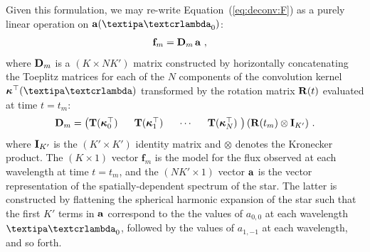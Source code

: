 \documentclass[modern]{aastex631}
\begin{document}
Given this formulation, we may re-write Equation~(\ref{eq:deconv:F}) as a purely linear operation on $\alm(\lnlam_0)$:
%
\begin{align}
    \label{eq:linear:ft}
    {\ensuremath{\mathbf{f}}}_m
     & =
    {\mathbf{D}}_m
    \,
    {\mathbf{a}}
    \hskip 0.33em,
\end{align}
%
where ${\mathbf{D}}_m$ is a $(K \times N K')$ matrix constructed by horizontally concatenating the Toeplitz matrices for each of the $N$ components of the convolution kernel $\kT(\lnlam)$ transformed by the rotation matrix ${\mathbf{R}}(t)$ evaluated at time $t = t_m$:
%
\begin{align}
    \label{eq:linear:Dm}
    {\ensuremath{\mathbf{D}}}_m =
    \begin{pmatrix}
        {\ensuremath{\mathbf{T}}}(\boldsymbol{\kappa}^\top_0)
        \hskip 0.33em
         &
        \hskip 0.33em
        {\mathbf{T}}(\boldsymbol{\kappa}^\top_1)
        \hskip 0.33em
         &
        \hskip 0.33em
        \cdots
        \hskip 0.33em
         &
        \hskip 0.33em
        {\mathbf{T}}(\boldsymbol{\kappa}^\top_N)
        \hskip 0.33em
    \end{pmatrix}
    ({\mathbf{R}}(t_m) \otimes {\ensuremath{\mathbf{I}}}_{K'})
    \hskip 0.33em.
\end{align}
%
where ${\mathbf{I}}_{K'}$ is the $(K' \times K')$ identity matrix and $\otimes$ denotes the Kronecker product.
%
The $(K \times 1)$ vector $\mathbf{f}_m$ is the model for the flux observed at each wavelength at time $t = t_m$, and the $(N K' \times 1)$ vector ${\mathbf{a}}$ is the vector representation of the spatially-dependent spectrum of the star. 
The latter is constructed by flattening the spherical harmonic expansion of the star such that the first $K'$ terms in ${\mathbf{a}}$ correspond to the the values of $a_{0,0}$ at each wavelength $\lnlam_0$, followed by the values of $a_{1,-1}$ at each wavelength, and so forth.
\end{document}
